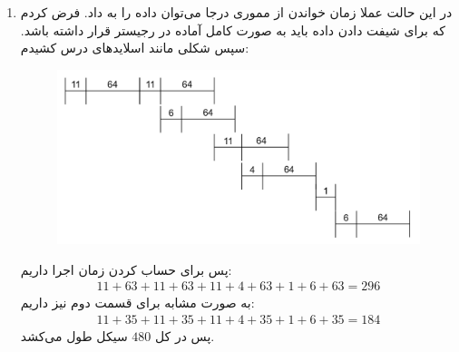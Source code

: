 \begin{enumerate}
    \item در این حالت عملا زمان خواندن از مموری درجا می‌توان داده را به  داد. فرض کردم که برای شیفت دادن
    داده باید به صورت کامل آماده در رجیستر قرار داشته باشد. سپس شکلی مانند اسلاید‌های درس کشیدم:
    \begin{figure}[H]
        \centering
        \includegraphics[scale=0.45]{pics/3-c.png}
    \end{figure}
    پس برای حساب کردن زمان اجرا داریم:
    \begin{gather*}
        11 + 63 + 11 + 63 + 11 + 4 + 63 + 1 + 6 + 63 = 296
    \end{gather*}
    به صورت مشابه برای قسمت دوم نیز داریم:
    \begin{gather*}
        11 + 35 + 11 + 35 + 11 + 4 + 35 + 1 + 6 + 35 = 184
    \end{gather*}
    پس در کل
    $480$
    سیکل طول می‌کشد.
\end{enumerate}